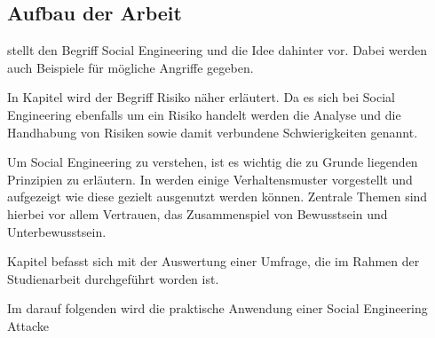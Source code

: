 \subsection{Aufbau der Arbeit}\label{sec:aufbau_der_arbeit}
 stellt den Begriff Social Engineering und die Idee dahinter vor.
Dabei werden auch Beispiele für mögliche Angriffe gegeben.

In Kapitel  wird der Begriff Risiko näher erläutert.
Da es sich bei Social Engineering ebenfalls um ein Risiko handelt werden die Analyse und die Handhabung
von Risiken sowie damit verbundene Schwierigkeiten genannt.

Um Social Engineering zu verstehen, ist es wichtig die zu Grunde liegenden Prinzipien zu erläutern.
In  werden einige Verhaltensmuster vorgestellt und aufgezeigt
wie diese gezielt ausgenutzt werden können.
Zentrale Themen sind hierbei vor allem Vertrauen, das Zusammenspiel von Bewusstsein und Unterbewusstsein.

Kapitel  befasst sich mit der Auswertung einer Umfrage, die im Rahmen der
Studienarbeit durchgeführt worden ist.

Im darauf folgenden  wird die praktische Anwendung einer Social Engineering Attacke 